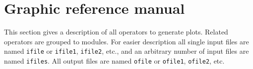 \chapter{\label{refman}Graphic reference manual}

This section gives a description of all {\CDO} operators to generate plots.
Related operators are grouped to modules.
For easier description all single input files are named \texttt{ifile} or \texttt{ifile1}, \texttt{ifile2}, etc.,
and an arbitrary number of input files are named \texttt{ifiles}.
All output files are named \texttt{ofile} or \texttt{ofile1}, \texttt{ofile2}, etc.


\hspace{3mm}



